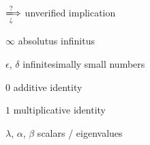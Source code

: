 \documentclass[12pt, oneside]{book}
\begin{document}
\begin{changemargin}{-2cm}{-2cm}
\begin{minipage}[t]{0.6\textwidth}
$\xLongrightarrow[\textup{\mbox{?`}}]{?}$ \hfill unverified implication\

\medskip

$\infty$ \hfill absolutus infinitus\

\medskip

$\epsilon$, $\delta$ \hfill infinitesimally small numbers\

\medskip

$0$ \hfill additive identity\

\medskip

$1$ \hfill multiplicative identity\

\medskip

$\lambda$, $\alpha$, $\beta$ \hfill scalars / eigenvalues\


\end{minipage}

\end{changemargin}


\pagebreak
\end{document}
